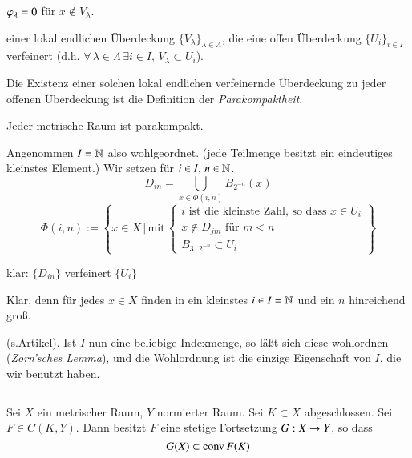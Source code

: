 \begin{description}
\begin{itemize}
            $\varphi_\lambda=0$ für $x\nin V_\lambda$.
        \end{itemize}
        \item[„Konstruktion“] einer lokal endlichen Überdeckung $\{V_\lambda\}_{\lambda\in\Lambda}$, die
        eine offen Überdeckung $\{U_i\}_{i\in I}$ verfeinert (d.h. $\forall \, \lambda\in \Lambda \, 
        \exists i \in I, \, V_\lambda\subset U_i$).
        \item{Die Existenz} einer solchen lokal endlichen verfeinernde Überdeckung zu jeder offenen
        Überdeckung ist die Definition der \textit{Parakompaktheit}.
        \begin{theorem}\label{2.11}
                    Jeder metrische Raum ist parakompakt.
        \end{theorem}

        \begin{idea}
        Angenommen $I=\mathbb{N}$ also wohlgeordnet. (jede Teilmenge besitzt ein eindeutiges kleinstes Element.)
        Wir setzen für $i\in I, \, n\in \mathbb{N}$.
        \[
            D_{in}=\bigcup_{x\in \Phi(i,n)} B_{2^{-n}}(x)
        \]
        \[
            \Phi(i,n):=\left\{x\in X \, \Big| \, \text{mit}\, \begin{cases}\text{$i$ ist die kleinste
            Zahl, so dass $x\in U_i$}\\ \text{$x\nin D_{jm}$ für $m<n$}\\ B_{3\cdot2^{-n}}\subset U_i  
            \end{cases}\right\}
        \]
        \begin{description}
        \item klar: $\{ D_{in} \}$ verfeinert $\{U_i\}$
        \item[Überdeckung:] Klar, denn für jedes $x\in X$ finden in ein kleinstes $i\in I=\mathbb{N}$ und ein
        $n$ hinreichend groß.
        \item[lokale Endlichkeit:] (s.Artikel).
        Ist $I$ nun eine beliebige Indexmenge, so läßt sich diese wohlordnen (\textit{Zorn'sches Lemma}),
        und die Wohlordnung ist die einzige Eigenschaft von $I$, die wir benutzt haben.
        \end{description}
        \[ \]
        \end{idea}
    \end{description}
\begin{theorem}\label{2.12}
    Sei $X$ ein metrischer Raum, $Y$ normierter Raum. Sei $K\subset X$ abgeschlossen. Sei $F\in C(K,Y)$.
    Dann besitzt $F$ eine stetige Fortsetzung $G:X\rightarrow Y$, so dass
    \[
        G(X)\subset\mathrm{conv}\, F(K)
    \]
\end{theorem}

